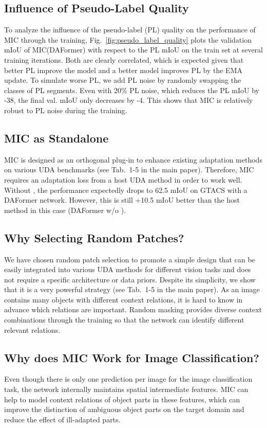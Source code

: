 \documentclass[10pt,twocolumn,letterpaper]{article}
\begin{document}
\subsection{Influence of Pseudo-Label Quality}
To analyze the influence of the pseudo-label (PL) quality on the performance of MIC through the training, Fig.~\ref{fig:pseudo_label_quality} plots the validation mIoU of MIC(DAFormer) with respect to the PL mIoU on the train set at several training iterations.
Both are clearly correlated, which is expected given that better PL improve the model and a better model improves PL by the EMA update.
To simulate worse PL, we add PL noise by randomly swapping the classes of PL segments. Even with 20\% PL noise, which reduces the PL mIoU by -38, the final val. mIoU only decreases by -4. This shows that MIC is relatively robust to PL noise during the training.

\subsection{MIC as Standalone}
MIC is designed as an orthogonal plug-in to enhance existing adaptation methods on various UDA benchmarks (see Tab.~1-5 in the main paper). Therefore, MIC requires an adaptation loss  from a host UDA method in order to work well. Without , the performance expectedly drops to 62.5 mIoU on GTACS with a DAFormer network.
However, this is still +10.5 mIoU better than the host method in this case (DAFormer w/o ).

\subsection{Why Selecting Random Patches?}
We have chosen random patch selection to promote a simple design that can be easily integrated into various UDA methods for different vision tasks and does not require a specific architecture or data priors.
Despite its simplicity, we show that it is a very powerful strategy (see Tab.~1-5 in the main paper).
As an image contains many objects with different context relations, it is hard to know in advance which relations are important. Random masking provides diverse context combinations through the training so that the network can identify different relevant relations.

\subsection{Why does MIC Work for Image Classification?}
Even though there is only one prediction per image for the image classification task, the network internally maintains spatial intermediate features. MIC can help to model context relations of object parts in these features, which can improve the distinction of ambiguous object parts on the target domain and reduce the effect of ill-adapted parts.
\end{document}

